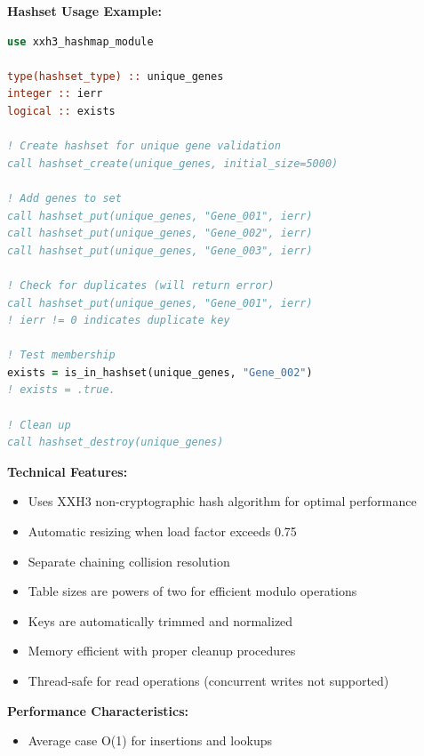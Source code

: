 \documentclass[11pt]{article}
\begin{document}
\begin{enumerate}
\begin{enumerate}
	      	      \textbf{Hashset Usage Example:}
	      	      \begin{lstlisting}[language=Fortran]
use xxh3_hashmap_module

type(hashset_type) :: unique_genes
integer :: ierr
logical :: exists

! Create hashset for unique gene validation
call hashset_create(unique_genes, initial_size=5000)

! Add genes to set
call hashset_put(unique_genes, "Gene_001", ierr)
call hashset_put(unique_genes, "Gene_002", ierr)
call hashset_put(unique_genes, "Gene_003", ierr)

! Check for duplicates (will return error)
call hashset_put(unique_genes, "Gene_001", ierr)
! ierr != 0 indicates duplicate key

! Test membership
exists = is_in_hashset(unique_genes, "Gene_002")
! exists = .true.

! Clean up
call hashset_destroy(unique_genes)
	      	      \end{lstlisting}
	      \end{enumerate}
	      
	      \textbf{Technical Features:}
	      \begin{itemize}
	      	\item Uses XXH3 non-cryptographic hash algorithm for optimal performance
	      	      
	      	\item Automatic resizing when load factor exceeds 0.75
	      	      
	      	\item Separate chaining collision resolution
	      	      
	      	\item Table sizes are powers of two for efficient modulo operations
	      	      
	      	\item Keys are automatically trimmed and normalized
	      	      
	      	\item Memory efficient with proper cleanup procedures
	      	      
	      	\item Thread-safe for read operations (concurrent writes not supported)
	      \end{itemize}
	      
	      \textbf{Performance Characteristics:}
	      \begin{itemize}
	      	\item Average case O(1) for insertions and lookups
	      	      

\end{itemize}
\end{enumerate}
\end{document}
